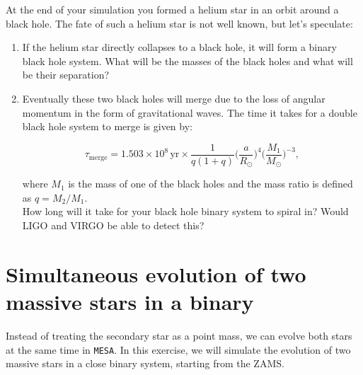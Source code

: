 \documentclass[11pt,a4paper]{article}
\begin{document}
At the end of your simulation you formed a helium star in an orbit around a black hole. The fate of such a helium star is not well known, but let's speculate:

\begin{enumerate}
  \item If the helium star directly collapses to a black hole, it will form a binary black hole system. What will be the masses of the black holes and what will be their separation?

  \item Eventually these two black holes will merge due to the loss of angular momentum in the form of gravitational waves. The time it takes for a double black hole system to merge is given by:
  
  \begin{equation*}
  \tau_{\mathrm{merge}} = 1.503 \times 10^8\,\mathrm{yr} \times \frac{1}{q(1+q)}\bigg(\frac{a}{R_\odot}\bigg)^4\bigg(\frac{M_1}{M_\odot}\bigg)^{-3},
  \end{equation*}
  
  where $M_1$ is the mass of one of the black holes and the mass ratio is defined as $q=M_2/M_1$.\\[1ex]
  How long will it take for your black hole binary system to spiral in? Would LIGO and VIRGO be able to detect this?

\end{enumerate}


\section{Simultaneous evolution of two massive stars in a binary}

Instead of treating the secondary star as a point mass, we can evolve both stars at the same time in \texttt{MESA}. In this exercise, we will simulate the evolution of two massive stars in a close binary system, starting from the ZAMS.
\end{document}
